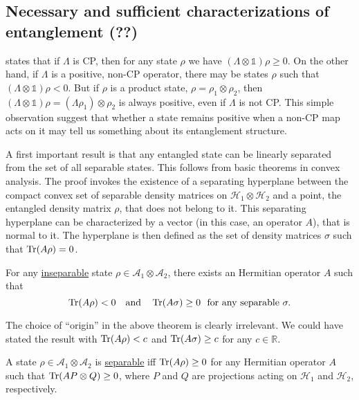 \documentclass[12pt]{report}
\begin{document}
\subsection{Necessary and sufficient characterizations of entanglement (??)}
 states that if $\Lambda$ is \ac{CP},
then for any state $\rho$ we have $(\Lambda \otimes \mathds1)\rho \ge 0$.
On the other hand, if $\Lambda$ is a positive, non-\ac{CP} operator, there may be states $\rho$ such that
$(\Lambda \otimes \mathds1)\rho < 0$.
But if $\rho$ is a product state, $\rho = \rho_1 \otimes \rho_2$, then
$(\Lambda \otimes \mathds1)\rho = (\Lambda \rho_1) \otimes \rho_2$ is always positive,
even if $\Lambda$ is not \ac{CP}.
This simple observation suggest that whether a state remains positive when a non-\ac{CP} map acts on it may tell us something about its entanglement structure.

A first important result is that any entangled state can be linearly separated from the set of all separable states.
This follows from basic theorems in convex analysis.
The proof invokes the existence of a separating hyperplane between the compact convex set of separable density matrices on $\mathcal H_1 \otimes \mathcal H_2$ and a point,
the entangled density matrix $\rho$,
that does not belong to it.
This separating hyperplane can be characterized by a vector (in this case, an operator $A$),
that is normal to it.
The hyperplane is then defined as the set of density matrices $\sigma$ such that
$\Tr(A\rho) = 0$.
\begin{thm}
	For any \uline{inseparable} state $\rho \in \mathcal A_1 \otimes \mathcal A_2$,
	there exists an Hermitian operator $A$ such that
	\begin{equation}
		\Tr(A\rho) < 0
		\quad \text{and} \quad
		\Tr(A\sigma) \ge 0
		\,\, \text{ for any separable }\sigma.
	\end{equation}
\end{thm}

\begin{remark}
	The choice of ``origin'' in the above theorem is clearly irrelevant.
	We could have stated the result with $\Tr(A\rho) < c$ and
	$\Tr(A\sigma) \ge c$ for any $c \in \mathbb R$.
\end{remark}

\begin{lemma}
	A state $\rho \in \mathcal A_1 \otimes \mathcal A_2$ is \uline{separable} iff
	$\Tr(A\rho) \ge 0$
	for any Hermitian operator $A$ such that
	$\Tr(A P\otimes Q) \ge 0$, where $P$ and $Q$ are projections acting on
	$\mathcal H_1$ and $\mathcal H_2$, respectively.
	\label{lemma:horodecki96_separable_iff_TrArhoPositive}
\end{lemma}
\end{document}

